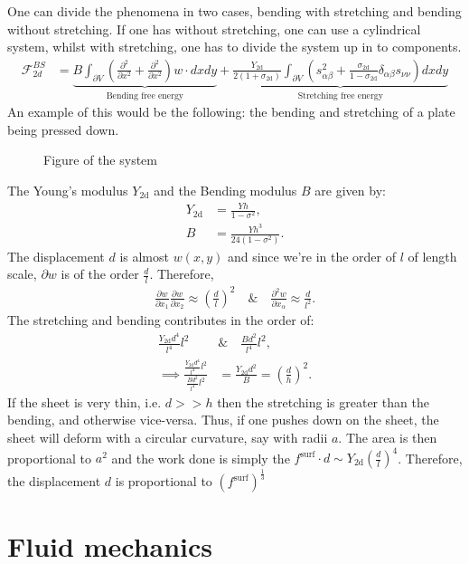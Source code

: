 \documentclass[a4paper]{article}
\newcommand{\f}{\mathcal{F}}
\begin{document}
\vspace*{.5cm}\noindent
One can divide the phenomena in two cases, bending with stretching and bending without stretching. If one has without stretching, one can use a cylindrical system, whilst with stretching, one has to divide the system up in to components.
\begin{align*}
    \f_{2d}^{BS} &= \underbrace{B\int_{\partial V}\left(\frac{\partial^2}{\partial x^2} + \frac{\partial^2}{\partial x^2}\right)w\cdot dxdy}_{\text{Bending free energy}} + \underbrace{\frac{Y_{\text{2d}}}{2(1+\sigma_{\text{2d}})}\int_{\partial V}\left(s_{\alpha\beta}^2 + \frac{\sigma_{\text{2d}}}{1-\sigma_{\text{2d}}}\delta_{\alpha\beta}s_{\nu\nu}\right)dxdy}_{\text{Stretching free energy}}
\end{align*}
An example of this would be the following: the bending and stretching of a plate being pressed down.
\begin{figure}[H]
    \centering
    \label{fig: plate bending}
    \caption{Figure of the system}
\end{figure}\noindent
The Young's modulus $Y_{\text{2d}}$ and the Bending modulus $B$ are given by:
\begin{align*}
    Y_{\text{2d}} &= \frac{Yh}{1-\sigma^2},\\
    B &= \frac{Yh^3}{24(1-\sigma^2)}.
\end{align*}The displacement $d$ is almost $w(x,y)$ and since we're in the order of $l$ of length scale, $\partial w$ is of the order $\frac{d}{l}$.
Therefore,
\begin{align*}
    \frac{\partial w}{\partial x_1}\frac{\partial w}{\partial x_2} \approx \left(\frac{d}{l}\right)^2\quad\&\quad \frac{\partial^2 w}{\partial x_\alpha} \approx \frac{d}{l^2}.
\end{align*}The stretching and bending contributes in the order of:
\begin{align*}
    \frac{Y_{\text{2d}}d^4}{l^4}l^2 \quad &\& \quad \frac{Bd^2}{l^4}l^2,\\
    \implies \frac{\frac{Y_{\text{2d}}d^4}{l^4}l^2}{\frac{Bd^2}{l^4}l^2} &=\frac{Y_{\text{2d}}d^2}{B}= \left(\frac{d}{h}\right)^2.
\end{align*}If the sheet is very thin, i.e. $d >> h$ then the stretching is greater than the bending, and otherwise vice-versa.
Thus, if one pushes down on the sheet, the sheet will deform with a circular curvature, say with radii $a$. The area is then proportional to $a^2$ and the work done is simply the $f^{\text{surf}}\cdot d\sim Y_{\text{2d}}\left(\frac{d}{l}\right)^4$.
Therefore, the displacement $d$ is proportional to $\left(f^{\text{surf}}\right)^\frac{1}{3}$






\section{Fluid mechanics}\label{sec: Fluid mechanics}
\end{document}
